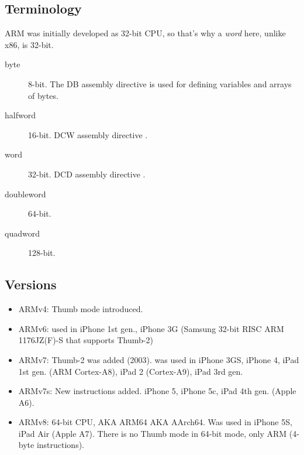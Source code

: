
\subsection{Terminology}

ARM was initially developed as 32-bit \ac{CPU}, 
so that's why a \emph{word} here, unlike x86, is 32-bit.

\begin{description}
	\item[byte] 8-bit.
		The DB assembly directive is used for defining variables and arrays of bytes.
	\item[halfword] 16-bit. DCW assembly directive \dittoclosing.
	\item[word] 32-bit.  DCD assembly directive \dittoclosing.
	\item[doubleword] 64-bit.
	\item[quadword] 128-bit.
\end{description}

\subsection{Versions}

\begin{itemize}
\item ARMv4: Thumb mode introduced.

\item ARMv6: used in iPhone 1st gen., iPhone 3G (Samsung 32-bit RISC ARM 1176JZ(F)-S that supports Thumb-2)

\item ARMv7: Thumb-2 was added (2003).
was used in iPhone 3GS, iPhone 4, iPad 1st gen. (ARM Cortex-A8), iPad 2 (Cortex-A9),
iPad 3rd gen.

\item ARMv7s: New instructions added.
iPhone 5, iPhone 5c, iPad 4th gen. (Apple A6).

\item ARMv8: 64-bit CPU, \ac{AKA} ARM64 \ac{AKA} AArch64.
Was used in iPhone 5S, iPad Air (Apple A7).
There is no Thumb mode in 64-bit mode, only ARM (4-byte instructions).
\end{itemize}



